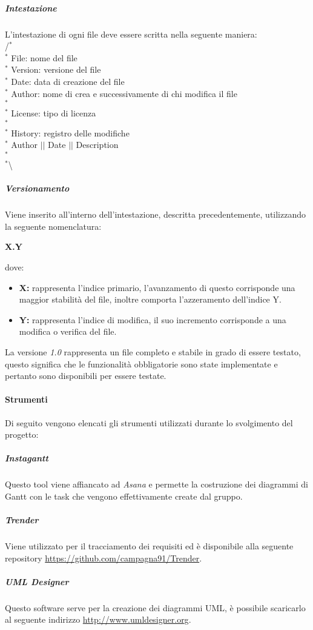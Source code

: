 \subparagraph{Intestazione}
L'intestazione di ogni file deve essere scritta nella seguente maniera: \\
/$^{*}$\\
$^{*}$ File: nome del file \\
$^{*}$ Version: versione del file \\
$^{*}$ Date: data di creazione del file \\
$^{*}$ Author: nome di crea e successivamente di chi modifica il file \\
$^{*}$ \\
$^{*}$ License: tipo di licenza \\
$^{*}$ \\
$^{*}$ History: registro delle modifiche \\
$^{*}$ Author $\vert$$\vert$ Date $\vert$$\vert$ Description \\
$^{*}$ \\
$^{*}$\textbackslash

\subparagraph{Versionamento}
Viene inserito all'interno dell'intestazione, descritta precedentemente, utilizzando la seguente nomenclatura:
\begin{center}
	\textbf{X.Y}
\end{center}
dove:
\begin{itemize}
	\item \textbf{X:} rappresenta l'indice primario, l'avanzamento di questo corrisponde una maggior stabilità del file, inoltre comporta l'azzeramento dell'indice Y.
	\item \textbf{Y:} rappresenta l'indice di modifica, il suo incremento corrisponde a una modifica o verifica del file. 
\end{itemize}
La versione \textit{1.0} rappresenta un file completo e stabile in grado di essere testato, questo significa che le funzionalità obbligatorie sono state implementate e pertanto sono disponibili per essere testate.

\paragraph{Strumenti}
Di seguito vengono elencati gli strumenti utilizzati durante lo svolgimento del progetto:

\subparagraph{Instagantt}
Questo tool viene affiancato ad \textit{Asana} e permette la costruzione dei diagrammi di Gantt con le task che vengono effettivamente create dal gruppo.
\subparagraph{Trender}
Viene utilizzato per il tracciamento dei requisiti ed è disponibile alla seguente repository \url{https://github.com/campagna91/Trender}.
\subparagraph{UML Designer}
Questo software serve per la creazione dei diagrammi UML, è possibile scaricarlo al seguente indirizzo \url{http://www.umldesigner.org}.



